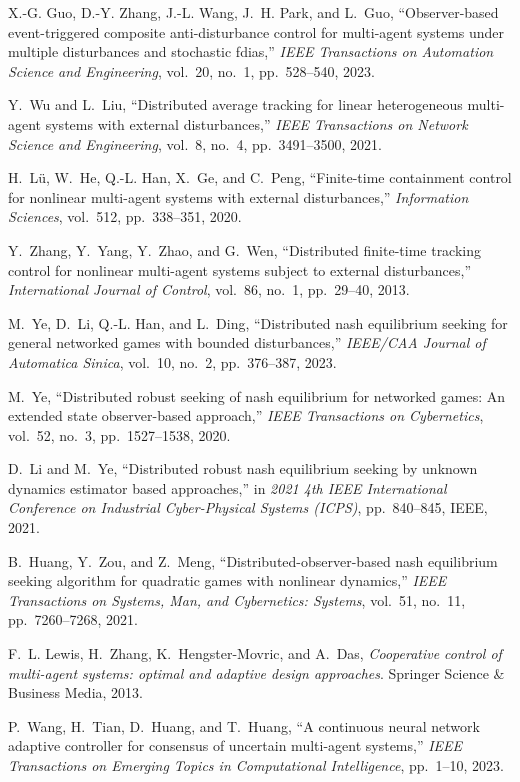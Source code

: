 \documentclass[lettersize,journal]{IEEEtran}
\begin{document}
\begin{thebibliography}{10}
    X.-G. Guo, D.-Y. Zhang, J.-L. Wang, J.~H. Park, and L.~Guo, ``Observer-based event-triggered composite anti-disturbance control for multi-agent systems under multiple disturbances and stochastic fdias,'' {\em IEEE Transactions on Automation Science and Engineering}, vol.~20, no.~1, pp.~528--540, 2023.

    Y.~Wu and L.~Liu, ``Distributed average tracking for linear heterogeneous multi-agent systems with external disturbances,'' {\em IEEE Transactions on Network Science and Engineering}, vol.~8, no.~4, pp.~3491--3500, 2021.

    H.~Lü, W.~He, Q.-L. Han, X.~Ge, and C.~Peng, ``Finite-time containment control for nonlinear multi-agent systems with external disturbances,'' {\em Information Sciences}, vol.~512, pp.~338--351, 2020.

    Y.~Zhang, Y.~Yang, Y.~Zhao, and G.~Wen, ``Distributed finite-time tracking control for nonlinear multi-agent systems subject to external disturbances,'' {\em International Journal of Control}, vol.~86, no.~1, pp.~29--40, 2013.

    M.~Ye, D.~Li, Q.-L. Han, and L.~Ding, ``Distributed nash equilibrium seeking for general networked games with bounded disturbances,'' {\em IEEE/CAA Journal of Automatica Sinica}, vol.~10, no.~2, pp.~376--387, 2023.

    M.~Ye, ``Distributed robust seeking of nash equilibrium for networked games: An extended state observer-based approach,'' {\em IEEE Transactions on Cybernetics}, vol.~52, no.~3, pp.~1527--1538, 2020.

    D.~Li and M.~Ye, ``Distributed robust nash equilibrium seeking by unknown dynamics estimator based approaches,'' in {\em 2021 4th IEEE International Conference on Industrial Cyber-Physical Systems (ICPS)}, pp.~840--845, IEEE, 2021.

    B.~Huang, Y.~Zou, and Z.~Meng, ``Distributed-observer-based nash equilibrium seeking algorithm for quadratic games with nonlinear dynamics,'' {\em IEEE Transactions on Systems, Man, and Cybernetics: Systems}, vol.~51, no.~11, pp.~7260--7268, 2021.

    F.~L. Lewis, H.~Zhang, K.~Hengster-Movric, and A.~Das, {\em Cooperative control of multi-agent systems: optimal and adaptive design approaches}.
    \newblock Springer Science \& Business Media, 2013.

    P.~Wang, H.~Tian, D.~Huang, and T.~Huang, ``A continuous neural network adaptive controller for consensus of uncertain multi-agent systems,'' {\em IEEE Transactions on Emerging Topics in Computational Intelligence}, pp.~1--10, 2023.

\end{thebibliography}
\end{document}
